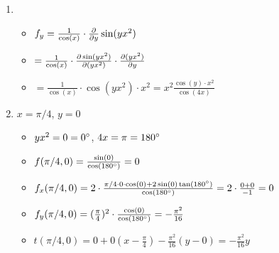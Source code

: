 \item
	\begin{enumerate}
	
	\item
		\begin{itemize}
			\item $f_y = \frac{1}{\cos(x)} \cdot \frac{\partial }{\partial y} \sin(yx^2)$
			\item $= \frac{1}{\cos(x)} \cdot \frac{\partial \sin(yx^2)}{\partial (yx^2)} \cdot \frac{\partial (yx^2)}{\partial y}$
			\item $= \frac{1}{\cos(x)} \cdot \cos(yx^2) \cdot x^2 = x^2 \frac{\cos(y) \cdot x^2}{\cos(4x)}$			
		\end{itemize}
	
	\item $x=\pi/4$, $y=0$
		\begin{itemize}
			\item $yx^2 = 0 = \SI{0}{\degree}$, $4x=\pi = \SI{180}{\degree}$
			\item $f(\pi/4,0) = \frac{\sin(0)}{\cos(\SI{180}{\degree})} = 0$
			\item $f_x(\pi/4,0) = 2 \cdot \frac{\pi/4 \cdot 0 \cdot \cos(0)+2\sin(0)\tan(\SI{180}{\degree})}{\cos(\SI{180}{\degree})} = 2 \cdot \frac{0+0}{-1} = 0$
			\item $f_y(\pi/4,0) = (\frac{\pi}{4})^2 \cdot \frac{\cos(0)}{\cos(\SI{180}{\degree})} = - \frac{\pi^2}{16}$
			\item $t(\pi/4,0) = 0 + 0 (x-\frac{\pi}{4}) - \frac{\pi^2}{16} (y-0) = - \frac{\pi^2}{16} y$
		\end{itemize}
		
	\end{enumerate}
